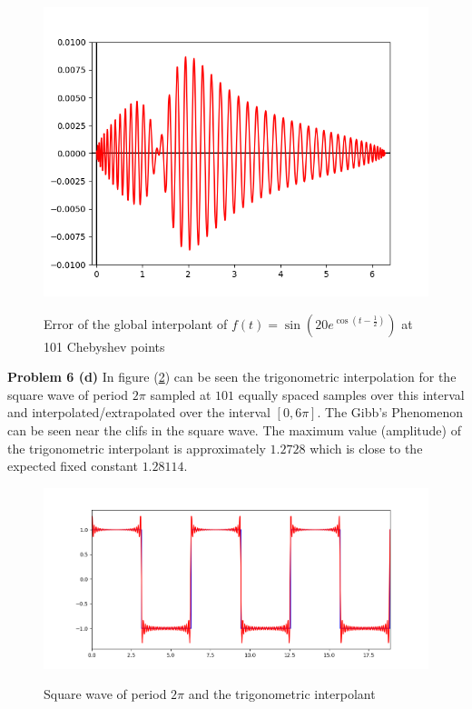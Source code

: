 \documentclass[12pt]{article}
\newcommand{\problem}[1]{\hspace{-4 ex} \large \textbf{Problem #1} }
\begin{document}
\begin{figure}[h]
	\caption{Error of the global interpolant of $f(t) = \sin(20 e^{\cos(t-\tfrac{1}{2})})$ at 101 Chebyshev points}
	\includegraphics[width=.8\textwidth]{hw5_p6_fig5}
	\label{hw5_p6_fig5}
	\centering
\end{figure}

\problem{6 (d)} In figure (\ref{hw5_p6_fig6}) can be seen the trigonometric interpolation for the square wave of period $2\pi$ sampled at $101$ equally spaced samples over this interval and interpolated/extrapolated over the interval $[0,6\pi]$. The Gibb's Phenomenon can be seen near the clifs in the square wave. The maximum value (amplitude) of the trigonometric interpolant is approximately $1.2728$ which is close to the expected fixed constant $1.28114$. 

\begin{figure}[h]
	\caption{Square wave of period $2\pi$ and the trigonometric interpolant}
	\includegraphics[width=1.0\textwidth]{hw5_p6_fig6}
	\label{hw5_p6_fig6}
	\centering
\end{figure}
\end{document}
